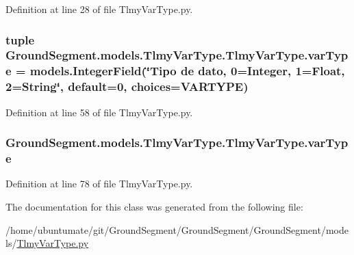 Definition at line 28 of file Tlmy\+Var\+Type.\+py.

\hypertarget{class_ground_segment_1_1models_1_1_tlmy_var_type_1_1_tlmy_var_type_a35be15cacdc2b07e3e0ef9a5962ef57a}{}
\subsubsection[{var\+Type}]{\setlength{\rightskip}{0pt plus 5cm}tuple Ground\+Segment.\+models.\+Tlmy\+Var\+Type.\+Tlmy\+Var\+Type.\+var\+Type = models.\+Integer\+Field(\char`\"{}Tipo de dato, 0=Integer, 1=Float, 2=String\char`\"{}, default=0, choices={\bf V\+A\+R\+T\+Y\+P\+E})\hspace{0.3cm}{\ttfamily [static]}}\label{class_ground_segment_1_1models_1_1_tlmy_var_type_1_1_tlmy_var_type_a35be15cacdc2b07e3e0ef9a5962ef57a}


Definition at line 58 of file Tlmy\+Var\+Type.\+py.

\hypertarget{class_ground_segment_1_1models_1_1_tlmy_var_type_1_1_tlmy_var_type_a3b48452b095327f2cefab2aec6b48c9b}{}
\subsubsection[{var\+Type}]{\setlength{\rightskip}{0pt plus 5cm}Ground\+Segment.\+models.\+Tlmy\+Var\+Type.\+Tlmy\+Var\+Type.\+var\+Type}\label{class_ground_segment_1_1models_1_1_tlmy_var_type_1_1_tlmy_var_type_a3b48452b095327f2cefab2aec6b48c9b}


Definition at line 78 of file Tlmy\+Var\+Type.\+py.



The documentation for this class was generated from the following file\+:\begin{DoxyCompactItemize}
\item 
/home/ubuntumate/git/\+Ground\+Segment/\+Ground\+Segment/\+Ground\+Segment/models/\hyperlink{_tlmy_var_type_8py}{Tlmy\+Var\+Type.\+py}\end{DoxyCompactItemize}

